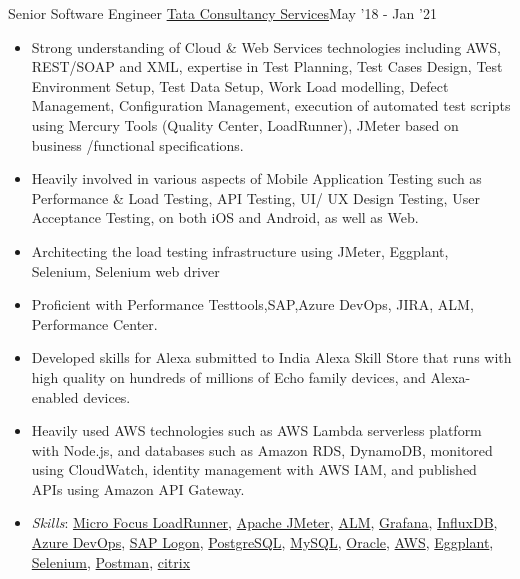 \documentclass[]{mcdowellcv}
\begin{document}
        \begin{cvsubsection}{Senior Software Engineer}
        {\href{https://www.tcs.com/}{Tata Consultancy Services}}{May '18 - Jan '21}
        
        \begin{itemize}
    
                \item Strong understanding of Cloud & Web Services technologies including
            AWS, REST/SOAP and XML, expertise in Test Planning, Test Cases
            Design, Test Environment Setup, Test Data Setup, Work Load modelling, Defect Management, Configuration Management, execution of automated test scripts using Mercury Tools (Quality Center, LoadRunner), JMeter based on business /functional specifications.

            \item Heavily involved in various aspects of Mobile
             Application Testing such as Performance & Load Testing, API Testing, UI/ UX
             Design Testing, User Acceptance Testing, on both iOS and Android, as well as Web.

            
            \item Architecting the load testing infrastructure using JMeter, Eggplant, Selenium, Selenium web driver

            \item Proficient with Performance Testtools,SAP,Azure DevOps, JIRA, ALM, Performance Center.

            \item Developed skills for Alexa submitted to India Alexa Skill Store that runs with high quality on hundreds of millions of Echo family devices, and Alexa-enabled devices. \item Heavily used AWS technologies such as AWS Lambda serverless platform with Node.js, and databases such as Amazon RDS, DynamoDB, monitored using CloudWatch, identity management with AWS IAM, and published APIs using Amazon API Gateway. 
        
            \hspace{2cm}\item \textit{Skills}: \href{https://www.microfocus.com/en-us/products/loadrunner-professional/overview}{Micro Focus LoadRunner},
            \href{https://jmeter.apache.org/}{Apache JMeter}, \href{https://www.microfocus.com/en-us/products/alm-quality-center/overview}{ALM},
            \href{https://grafana.com/}{Grafana}, \href{https://www.influxdata.com/}{InfluxDB}, \href{https://azure.microsoft.com/en-us/products/devops/}{Azure DevOps}, \href{https://help.sap.com/docs/}{SAP Logon}, \href{postgresql.org}{PostgreSQL},
            \href{https://www.mysql.com/}{MySQL},
            \href{https://www.oracle.com/database/}{Oracle},
            \href{https://aws.amazon.com/}{AWS},
            \href{https://www.eggplantsoftware.com/}{Eggplant},
            \href{https://www.selenium.dev/}{Selenium},
            \href{https://www.postman.com/}{Postman},
            \href{https://www.citrix.com/}{citrix}
            \end{itemize}
        \end{cvsubsection}{}{}{}
        
\end{document}
